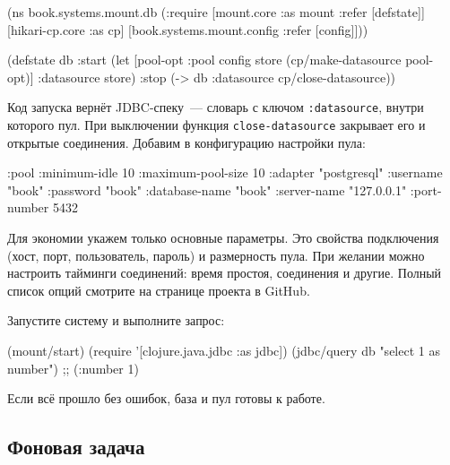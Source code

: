 \else

\begin{english}
  \begin{clojure}
(ns book.systems.mount.db
  (:require
   [mount.core :as mount :refer [defstate]]
   [hikari-cp.core :as cp]
   [book.systems.mount.config :refer [config]]))

(defstate db
  :start
  (let [{pool-opt :pool} config
        store (cp/make-datasource pool-opt)]
    {:datasource store})
  :stop
  (-> db :datasource cp/close-datasource))
  \end{clojure}
\end{english}

\fi


Код запуска вернёт JDBC-спеку~--- словарь с ключом \verb|:datasource|, внутри
которого пул. При выключении функция \verb|close-datasource| закрывает его и
открытые соединения. Добавим в конфигурацию настройки пула:

\begin{english}
  \begin{clojure}
{:pool {:minimum-idle       10
        :maximum-pool-size  10
        :adapter            "postgresql"
        :username           "book"
        :password           "book"
        :database-name      "book"
        :server-name        "127.0.0.1"
        :port-number        5432}}
  \end{clojure}
\end{english}

Для экономии укажем только основные параметры. Это свойства подключения (хост,
порт, пользователь, пароль) и размерность пула. При желании можно настроить
тайминги соединений: время простоя, соединения и другие. Полный список опций
смотрите на странице проекта в GitHub.

Запустите систему и выполните запрос:

\begin{english}
  \begin{clojure}
(mount/start)
(require '[clojure.java.jdbc :as jdbc])
(jdbc/query db "select 1 as number")
;; ({:number 1})
  \end{clojure}
\end{english}

Если всё прошло без ошибок, база и пул готовы к работе.

\subsection{Фоновая задача}

